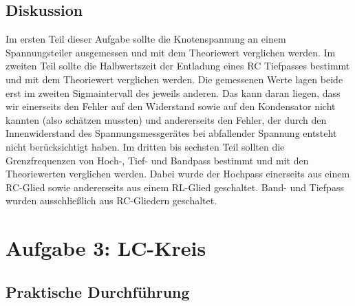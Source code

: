 \documentclass[12pt]{scrartcl}
\begin{document}
\subsection{Diskussion}
Im ersten Teil dieser Aufgabe sollte die Knotenspannung an einem Spannungsteiler ausgemessen und mit dem Theoriewert verglichen werden.
Im zweiten Teil sollte die Halbwertszeit der Entladung eines RC Tiefpasses bestimmt und mit dem Theoriewert verglichen werden. Die gemessenen Werte lagen beide erst im zweiten Sigmaintervall des jeweils anderen. Das kann daran liegen, dass wir einerseits den Fehler auf den Widerstand sowie auf den Kondensator nicht kannten (also schätzen mussten) und andererseits den Fehler, der durch den Innenwiderstand des Spannungsmessgerätes bei abfallender Spannung entsteht nicht berücksichtigt haben.
Im dritten bis sechsten Teil sollten die Grenzfrequenzen von Hoch-, Tief- und Bandpass bestimmt und mit den Theoriewerten verglichen werden. Dabei wurde der Hochpass einerseits aus einem RC-Glied sowie andererseits aus einem RL-Glied geschaltet. Band- und Tiefpass wurden ausschließlich aus RC-Gliedern geschaltet.

\section{Aufgabe 3: LC-Kreis}
\subsection{Praktische Durchführung}
\end{document}
